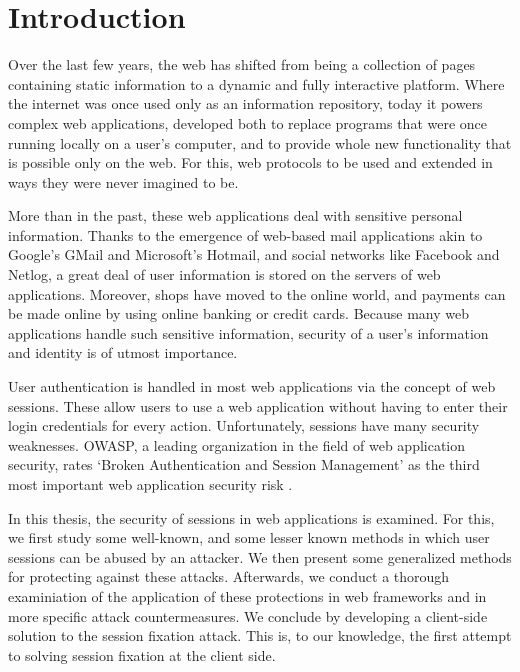 \chapter{Introduction} %

Over the last few years, the web has shifted from being a collection of pages containing static information to a dynamic and fully interactive platform. Where the internet was once used only as an information repository, today it powers complex web applications, developed both to replace programs that were once running locally on a user's computer, and to provide whole new functionality that is possible only on the web. For this, web protocols to be used and extended in ways they were never imagined to be.

More than in the past, these web applications deal with sensitive personal information. Thanks to the emergence of web-based mail applications akin to Google's GMail and Microsoft's Hotmail, and social networks like Facebook and Netlog, a great deal of user information is stored on the servers of web applications. Moreover, shops have moved to the online world, and payments can be made online by using online banking or credit cards. Because many web applications handle such sensitive information, security of a user's information and identity is of utmost importance.

User authentication is handled in most web applications via the concept of web sessions. These allow users to use a web application without having to enter their login credentials for every action. Unfortunately, sessions have many security weaknesses. OWASP, a leading organization in the field of web application security, rates `Broken Authentication and Session Management' as the third most important web application security risk \cite{Williams2010}.

In this thesis, the security of sessions in web applications is examined. For this, we first study some well-known, and some lesser known methods in which user sessions can be abused by an attacker. We then present some generalized methods for protecting against these attacks. Afterwards, we conduct a thorough examiniation of the application of these protections in web frameworks and in more specific attack countermeasures. We conclude by developing a client-side solution to the session fixation attack. This is, to our knowledge, the first attempt to solving session fixation at the client side.

